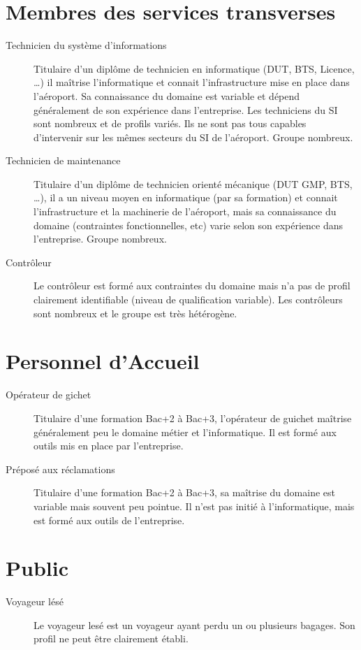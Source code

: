 \section{Membres des services transverses}
\begin{description}
\item[Technicien du système d'informations] Titulaire d'un diplôme de technicien
en informatique (DUT, BTS, Licence, \ldots) il maîtrise l'informatique et
connait l'infrastructure mise en place dans l'aéroport. Sa connaissance du
domaine est variable et dépend généralement de son expérience dans l'entreprise.
Les techniciens du SI sont nombreux et de profils variés. Ils ne sont pas tous
capables d'intervenir sur les mêmes secteurs du SI de l'aéroport. Groupe
nombreux.
\item[Technicien de maintenance] Titulaire d'un diplôme de technicien orienté
mécanique (DUT GMP, BTS, \ldots), il a un niveau moyen en informatique (par sa
formation) et connait l'infrastructure et la machinerie de l'aéroport, mais sa
connaissance du domaine (contraintes fonctionnelles, etc) varie selon son
expérience dans l'entreprise. Groupe nombreux. 
\item[Contrôleur] Le contrôleur est formé aux contraintes du domaine mais n'a
pas de profil clairement identifiable (niveau de qualification variable). Les
contrôleurs sont nombreux et le groupe est très hétérogène.
\end{description}

\section{Personnel d'Accueil}
\begin{description}
\item[Opérateur de gichet] Titulaire d'une formation Bac+2 à Bac+3, l'opérateur
de guichet maîtrise généralement peu le domaine métier et l'informatique. Il est
formé aux outils mis en place par l'entreprise.
\item[Préposé aux réclamations] Titulaire d'une formation Bac+2 à Bac+3, sa
maîtrise du domaine est variable mais souvent peu pointue. Il n'est pas initié à
l'informatique, mais est formé aux outils de l'entreprise.
\end{description}

\section{Public}
\begin{description}
\item[Voyageur lésé] Le voyageur lesé est un voyageur ayant perdu un ou
plusieurs bagages. Son profil ne peut être clairement établi.
\end{description}


